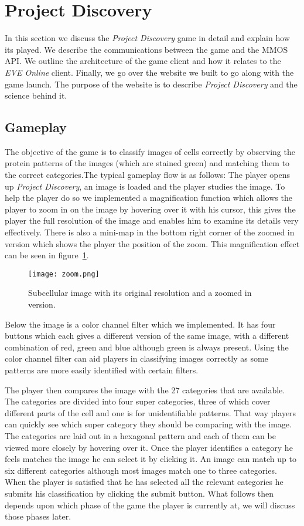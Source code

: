 \section{Project Discovery}\label{sec:projectdiscovery}
In this section we discuss the \emph{Project Discovery} game in detail and explain how its played. We describe the communications between the game and the MMOS API. We outline the architecture of the game client and how it relates to the \emph{EVE Online} client. Finally, we go over the website we built to go along with the game launch. The purpose of the website is to describe \emph{Project Discovery} and the science behind it.

\subsection{Gameplay}
The objective of the game is to classify images of cells correctly by observing the protein patterns of the images (which are stained green) and matching them to the correct categories.The typical gameplay flow is as follows: The player opens up \emph{Project Discovery}, an image is loaded and the player studies the image. To help the player do so we implemented a magnification function which allows the player to zoom in on the image by hovering over it with his cursor, this gives the player the full resolution of the image and enables him to examine its details very effectively. There is also a mini-map in the bottom right corner of the zoomed in version which shows the player the position of the zoom. This magnification effect can be seen in figure~\ref{fig:zoom}.

\begin{figure}[H]
\centering
\graphicspath{ {./graphics/} }
\centerline{\texttt{[image: zoom.png]}}
\caption{\label{fig:zoom}Subcellular image with its original resolution and a zoomed in version.}
\end{figure}

Below the image is a color channel filter which we implemented. It has four buttons which each gives a different version of the same image, with a different combination of red, green and blue although green is always present. Using the color channel filter can aid players in classifying images correctly as some patterns are more easily identified with certain filters.

The player then compares the image with the 27 categories that are available. The categories are divided into four super categories, three of which cover different parts of the cell and one is for unidentifiable patterns. That way players can quickly see which super category they should be comparing with the image. The categories are laid out in a hexagonal pattern and each of them can be viewed more closely by hovering over it. Once the player identifies a category he feels matches the image he can select it by clicking it. An image can match up to six different categories although most images match one to three categories. When the player is satisfied that he has selected all the relevant categories he submits his classification by clicking the submit button. What follows then depends upon which phase of the game the player is currently at, we will discuss those phases later.

